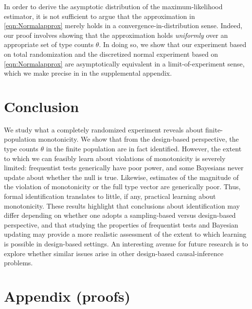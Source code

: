 \documentclass[12pt,reqno]{amsart}
\begin{document}
In order to derive the asymptotic distribution of the maximum-likelihood estimator, it is
not sufficient to argue that the approximation in \eqref{eqn:Normalapprox} merely holds in
a convergence-in-distribution sense.
Indeed, our proof involves showing that the approximation holds \emph{uniformly} over an
appropriate set of type counts $\theta$. In doing so, we show that our experiment based on
total randomization and the discretized normal experiment based on 
\eqref{eqn:Normalapprox} are asymptotically equivalent in a limit-of-experiment sense,
which we make precise in  in the supplemental appendix.















\section{Conclusion}

We study what a completely randomized experiment reveals about finite-population monotonicity. We show that from the design-based perspective, the type counts $\theta$ in the finite population are in fact identified. However, the extent to which we can feasibly learn about violations of monotonicity is severely limited: frequentist tests generically have poor power, and some Bayesians never update about whether the null is true. Likewise, estimates of the magnitude of the violation of monotonicity or the full type vector are generically poor. Thus, formal identification translates to little, if any, practical learning about monotonicity. These results highlight that conclusions about identification may differ depending on whether one adopts a sampling-based versus design-based perspective, and that studying the properties of frequentist tests and Bayesian updating may provide a more realistic assessment of the extent to which learning is possible in design-based settings. An interesting avenue for future research is to explore whether similar issues arise in other design-based causal-inference problems. 

\newpage




\newpage

\appendix
\renewcommand{\sectionname}{}
\section{Appendix (proofs)}
\end{document}
